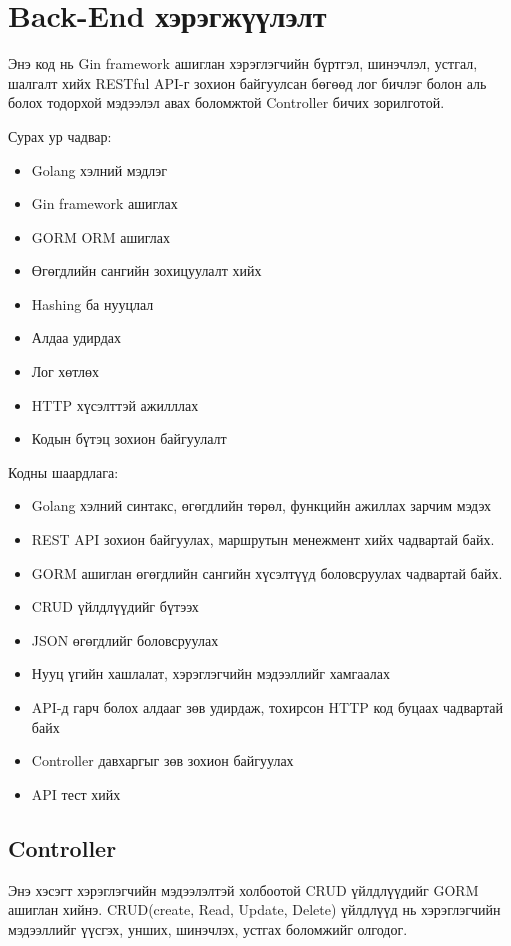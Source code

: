 \section{Back-End хэрэгжүүлэлт}
Энэ код нь Gin framework ашиглан хэрэглэгчийн бүртгэл, шинэчлэл, устгал, шалгалт хийх RESTful API-г зохион байгуулсан бөгөөд лог бичлэг болон аль болох тодорхой мэдээлэл авах боломжтой Controller бичих зорилготой. 

Сурах ур чадвар:
\begin{itemize}
	\item Golang хэлний мэдлэг
	\item Gin framework ашиглах
	\item GORM ORM ашиглах
	\item Өгөгдлийн сангийн зохицуулалт хийх
	\item Hashing ба нууцлал
	\item Алдаа удирдах
	\item Лог хөтлөх
	\item HTTP хүсэлттэй ажилллах
	\item Кодын бүтэц зохион байгуулалт
\end{itemize}

Кодны шаардлага:
\begin{itemize}
	\item Golang хэлний синтакс, өгөгдлийн төрөл, функцийн ажиллах зарчим мэдэх 
	\item REST API зохион байгуулах, маршрутын менежмент хийх чадвартай байх.
	\item GORM ашиглан өгөгдлийн сангийн хүсэлтүүд боловсруулах чадвартай байх.
	\item CRUD үйлдлүүдийг бүтээх
	\item JSON өгөгдлийг боловсруулах
	\item Нууц үгийн хашлалат, хэрэглэгчийн мэдээллийг хамгаалах
	\item API-д гарч болох алдааг зөв удирдаж, тохирсон HTTP код буцаах чадвартай байх
	\item Controller  давхаргыг зөв зохион байгуулах
	\item API тест хийх
\end{itemize}
\pagebreak

\subsection{Controller}
Энэ хэсэгт хэрэглэгчийн мэдээлэлтэй холбоотой CRUD үйлдлүүдийг GORM ашиглан хийнэ. CRUD(create, Read, Update, Delete) үйлдлүүд нь хэрэглэгчийн мэдээллийг үүсгэх, унших, шинэчлэх, устгах боломжийг олгодог.

